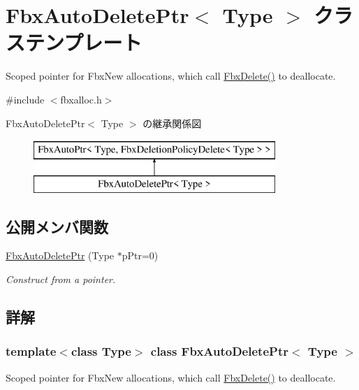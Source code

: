 \hypertarget{class_fbx_auto_delete_ptr}{}\section{Fbx\+Auto\+Delete\+Ptr$<$ Type $>$ クラステンプレート}
\label{class_fbx_auto_delete_ptr}


Scoped pointer for Fbx\+New allocations, which call \hyperlink{fbxalloc_8h_a55138f34ac93c519a78f624178c128d6}{Fbx\+Delete()} to deallocate.  




{\ttfamily \#include $<$fbxalloc.\+h$>$}

Fbx\+Auto\+Delete\+Ptr$<$ Type $>$ の継承関係図\begin{figure}[H]
\begin{center}
\leavevmode
\includegraphics[height=2.000000cm]{class_fbx_auto_delete_ptr}
\end{center}
\end{figure}
\subsection*{公開メンバ関数}
\begin{DoxyCompactItemize}
\item 
\hyperlink{class_fbx_auto_delete_ptr_af2ecfc69aa5dab398213f6e2275e8289}{Fbx\+Auto\+Delete\+Ptr} (Type $\ast$p\+Ptr=0)
\begin{DoxyCompactList}\small\item\em Construct from a pointer. \end{DoxyCompactList}\end{DoxyCompactItemize}


\subsection{詳解}
\subsubsection*{template$<$class Type$>$\newline
class Fbx\+Auto\+Delete\+Ptr$<$ Type $>$}

Scoped pointer for Fbx\+New allocations, which call \hyperlink{fbxalloc_8h_a55138f34ac93c519a78f624178c128d6}{Fbx\+Delete()} to deallocate. 

